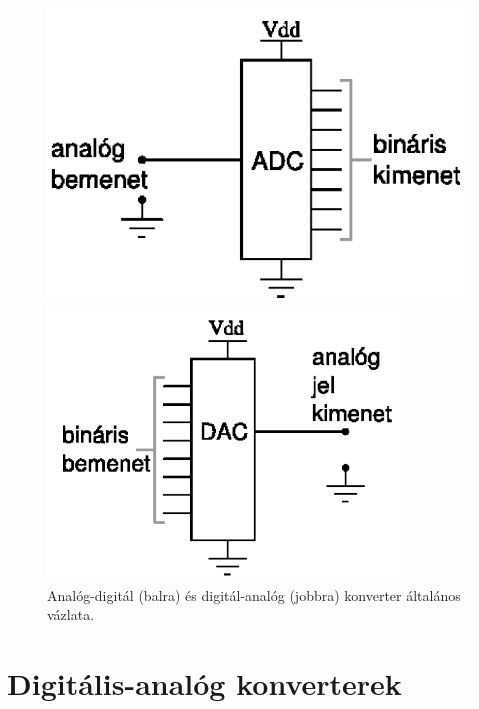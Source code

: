 \documentclass[12pt]{article}
\theoremstyle{plain}
\begin{document}
\begin{figure}[H]
	\centering
	\begin{minipage}{0.47\textwidth}
		\centering
		\includegraphics[width=1.0\textwidth]{./media/ADC_sketch.png}
	\end{minipage}\hfill
	\begin{minipage}{0.53\textwidth}
		\centering
		\includegraphics[width=0.85\textwidth]{./media/DAC_sketch.png}
	\end{minipage}
	\caption{Analóg-digitál (balra) és digitál-analóg (jobbra) konverter általános vázlata.}
	\label{fig:konverter_vazlat}
\end{figure}



\section{Digitális-analóg konverterek}
\end{document}
